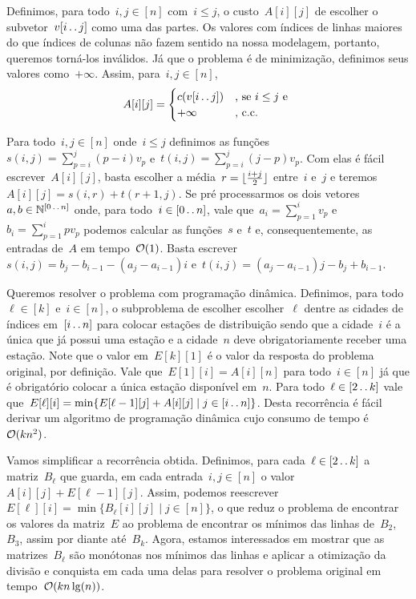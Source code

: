 Definimos, para todo~$i,j \in [n]$ com~$i \leq j$, o custo~$A[i][j]$ de escolher o subvetor~$v[i \,.\,.\, j]$ como uma das partes. Os valores com índices de linhas maiores do que índices de colunas não fazem sentido na nossa modelagem, portanto, queremos torná-los inválidos. Já que o problema é de minimização, definimos seus valores como~$+\infty$. Assim, para~$i,j \in [n]$,
\begin{equation*}
A[i][j] = \begin{cases}
    c(v[i \,.\,.\, j]) & \text{, se } i \leq j \text{ e }\\
    +\infty          & \text{, c.c.}
\end{cases}
\end{equation*}

Para todo~$i,j \in [n]$ onde~$i \leq j$ definimos as funções~${ s(i,j) = \sum\limits_{p = i}^j (p-i)v_p }$ e~${ t(i,j) = \sum\limits_{p = i}^j (j-p)v_p }$. Com elas é fácil escrever~$A[i][j]$, basta escolher a média~${ r = \lfloor\frac{i+j}{2}\rfloor }$ entre~$i$ e~$j$ e teremos~${ A[i][j] = s(i,r) + t(r+1,j) }$. Se pré processarmos os dois vetores~${ a,b \in \mathbb{N}^{[0 \,.\,.\, n]} }$ onde, para todo~${ i \in [0 \,.\,.\, n] }$, vale que~${ a_i = \sum\limits_{p=1}^i v_p }$ e~${ b_i = \sum\limits_{p=1}^i pv_p }$ podemos calcular as funções~$s$ e~$t$ e, consequentemente, as entradas de~$A$ em tempo~$\mathcal{O}(1)$. Basta escrever~${ s(i,j) = b_j - b_{i-1} - (a_j - a_{i-1})i }$ e~${ t(i,j) = (a_j - a_{i-1})j - b_j + b_{i-1} }$.

Queremos resolver o problema com programação dinâmica. Definimos, para todo~$\ell \in [k]$ e~$i \in [n]$, o subproblema de escolher escolher~$\ell$ dentre as cidades de índices em~${ [ i \,.\,.\, n] }$ para colocar estações de distribuição sendo que a cidade~$i$ é a única que já possui uma estação e a cidade~$n$ deve obrigatoriamente receber uma estação. Note que o valor em~$E[k][1]$ é o valor da resposta do problema original, por definição. Vale que~${ E[1][i] = A[i][n] }$ para todo~${ i \in [n] }$ já que é obrigatório colocar a única estação disponível em~$n$. Para todo~${ \ell \in [2 \,.\,.\, k] }$ vale que~${ E[\ell][i] = \min\{ E[\ell-1][j] + A[i][j] \mid j \in [i \,.\,.\, n] \} }$. Desta recorrência é fácil derivar um algoritmo de programação dinâmica cujo consumo de tempo é~$\mathcal{O}(kn^2)$.

Vamos simplificar a recorrência obtida. Definimos, para cada~$\ell \in [2 \,.\,.\, k]$ a matriz~$B_\ell$ que guarda, em cada entrada~$i,j \in [n]$ o valor~${ A[i][j] + E[\ell - 1][j] }$. Assim, podemos reescrever~${ E[\ell][i] = \min\{ B_\ell[i][j] \mid j \in [n] \} }$, o que reduz o problema de encontrar os valores da matriz~$E$ ao problema de encontrar os mínimos das linhas de~$B_2$,~$B_3$, assim por diante até~$B_k$. Agora, estamos interessados em mostrar que as matrizes~$B_\ell$ são monótonas nos mínimos das linhas e aplicar a otimização da divisão e conquista em cada uma delas para resolver o problema original em tempo~$\mathcal{O}(kn\lg(n))$.

